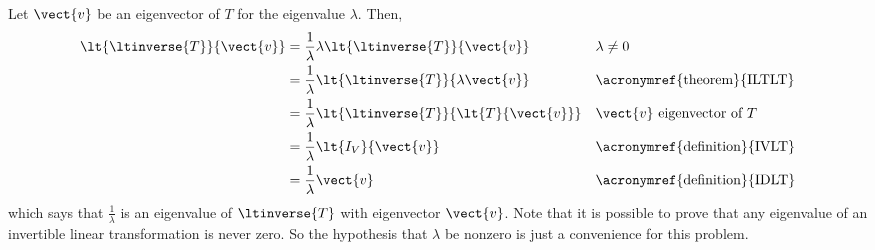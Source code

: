 Let $\vect{v}$ be an eigenvector of $T$ for the eigenvalue $\lambda$.  Then,
%
\begin{align*}
\lt{\ltinverse{T}}{\vect{v}}&=
\frac{1}{\lambda}\lambda\lt{\ltinverse{T}}{\vect{v}}&&\text{$\lambda\neq 0$}\\
&=\frac{1}{\lambda}\lt{\ltinverse{T}}{\lambda\vect{v}}&&\text{\acronymref{theorem}{ILTLT}}\\
&=\frac{1}{\lambda}\lt{\ltinverse{T}}{\lt{T}{\vect{v}}}&&\text{$\vect{v}$ eigenvector of $T$}\\
&=\frac{1}{\lambda}\lt{I_V}{\vect{v}}&&\text{\acronymref{definition}{IVLT}}\\
&=\frac{1}{\lambda}\vect{v}&&\text{\acronymref{definition}{IDLT}}
\end{align*}
%
which says that $\displaystyle\frac{1}{\lambda}$ is an eigenvalue of $\ltinverse{T}$ with eigenvector $\vect{v}$.  Note that it is possible to prove that any eigenvalue of an invertible linear transformation is never zero.  So the hypothesis that $\lambda$ be nonzero is just a convenience for this problem.
